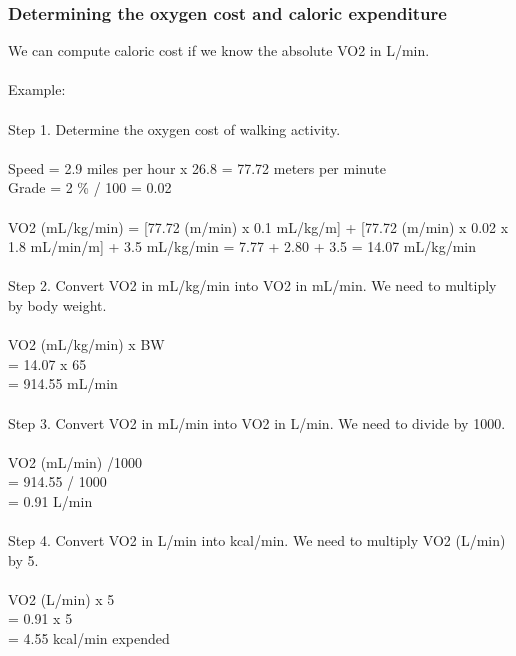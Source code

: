\documentclass[12pt, a4paper]{report}   %
\begin{document}
\begin{enumerate}
\clearpage
\subsubsection{Determining the oxygen cost and caloric expenditure}
We can compute caloric cost if we know the absolute VO2 in L/min.\\ \\
Example:\\ \\
Step 1. Determine the oxygen cost of walking activity.\\ \\
Speed = 2.9 miles per hour x 26.8 = 77.72 meters per minute\\
Grade = 2 \% / 100 = 0.02\\ \\
VO2 (mL/kg/min) = [77.72 (m/min) x 0.1 mL/kg/m] +
          [77.72 (m/min) x 0.02 x 1.8 mL/min/m] +
          		         3.5 mL/kg/min
		      = 7.77  + 2.80 + 3.5
		      = 14.07 mL/kg/min\\ \\
Step 2. Convert VO2 in mL/kg/min into VO2 in mL/min. We need to multiply by body weight.\\ \\
VO2 (mL/kg/min) x BW\\
= 14.07 x 65\\
= 914.55 mL/min\\ \\
Step 3. Convert VO2 in mL/min into VO2 in L/min. We need to divide by 1000.\\ \\
VO2 (mL/min) /1000\\
= 914.55 / 1000\\
= 0.91 L/min\\ \\
Step 4. Convert VO2 in L/min into kcal/min. We need to multiply VO2 (L/min) by 5.\\ \\
VO2 (L/min) x 5\\
= 0.91 x 5\\
= 4.55 kcal/min expended\\


\clearpage

\end{enumerate}
\end{document}
